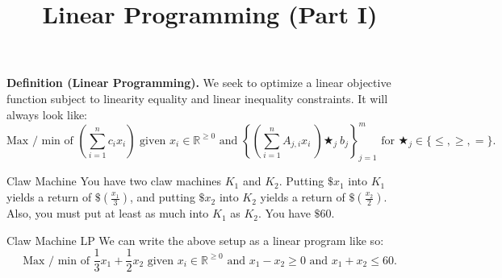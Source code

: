 \title{Linear Programming (Part I)}



\textbf{Definition (Linear Programming).} We seek to optimize a linear objective function subject to linearity equality and linear inequality constraints.  It will always look like:
\[ \text{Max / min of } \left(\sum_{i = 1}^n c_i x_i\right) \text{ given } x_i \in \mathbb{R}^{\geq 0} \text{ and } \left \{ \left(\sum_{i = 1}^n A_{j, i} x_i \ \right) \bigstar_j \ b_j \right \}_{j = 1}^m \text{ for } \bigstar_j \in \{ \leq , \geq , =\}. \]

\begin{problem}{Claw Machine}
    You have two claw machines $K_1$ and $K_2$.  Putting $\$x_1$ into $K_1$ yields a return of $\$ \left(\frac{x_1}{3}\right)$, and putting $\$x_2$ into $K_2$ yields a return of $\$ \left(\frac{x_2}{2}\right)$.  Also, you must put at least as much into $K_1$ as $K_2$.  You have $\$60$.
\end{problem}

\begin{solution*}{Claw Machine LP}
    We can write the above setup as a linear program like so:
    \[ \text{Max / min of } \dfrac{1}{3}x_1 + \dfrac{1}{2}x_2 \text{ given } x_i \in \mathbb{R}^{\geq 0} \text{ and } x_1 - x_2 \geq 0 \text{ and } x_1 + x_2 \leq 60. \]
\end{solution*}

